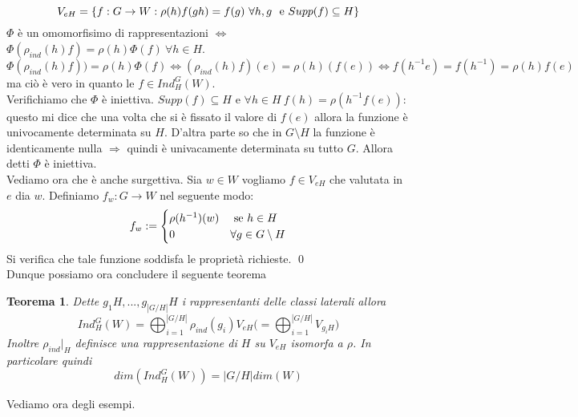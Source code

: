 \documentclass[11pt]{article}
\theoremstyle{plain}
\newtheorem{thm}{Teorema}[section]
\theoremstyle{definition}
\theoremstyle{remark}
\begin{document}
\[V_{eH}=\{f:G\rightarrow W: \rho(h)f(gh)=f(g)\ \forall h,g\ \ \textup{e } Supp(f)\subseteq H\}\]
$\Phi$ è un omomorfisimo di rappresentazioni $\Leftrightarrow$ $\Phi(\rho_{ind}(h)f)=\rho(h)\Phi(f)\ \forall h\in H$.
\[\Phi(\rho_{ind}(h)f))=\rho(h)\Phi(f) \Leftrightarrow (\rho_{ind}(h)f)(e)=\rho(h)(f(e))\Leftrightarrow f(h^{-1}e)=f(h^{-1})=\rho(h)f(e)\]
ma ciò è vero in quanto le $f\in Ind_H^G(W)$. \\
Verifichiamo che $\Phi$ è iniettiva. $Supp(f)\subseteq H$ e $\forall h\in H\ f(h)=\rho(h^{-1}f(e))$: questo mi dice che una volta che si è fissato il valore di $f(e)$ allora la funzione è univocamente determinata su $H$. D'altra parte so che in $G\setminus H$ la funzione è identicamente nulla $\Rightarrow$ quindi è univacamente determinata su tutto $G$. Allora detti $\Phi$ è iniettiva.\\
Vediamo ora che è anche surgettiva. Sia $w\in W$ vogliamo $f\in V_{eH}$ che valutata in $e$ dia $w$. Definiamo $f_w:G\rightarrow W$ nel seguente modo: 
\[f_w:=\begin{cases}
\rho(h^{-1})(w)& \textup{ se } h\in H\\
0& \forall g\in G\setminus H
\end{cases}\]
Si verifica che tale funzione soddisfa le proprietà richieste. \qed \\
Dunque possiamo ora concludere il seguente teorema
\begin{thm} Dette $g_1H,...,g_{|G/H|}H$ i rappresentanti delle classi laterali allora 
\[Ind_H^G(W)=\bigoplus_{i=1}^{|G/H|}\rho_{ind}(g_i)V_{eH}\bigl( =\bigoplus_{i=1}^{|G/H|} V_{g_iH}\bigr) \]
Inoltre $\rho_{ind}|_H$ definisce una rappresentazione di $H$ su $V_{eH}$ isomorfa a $\rho$. In particolare quindi 
\[dim(Ind_H^G(W))=|G/H|dim(W)\] 
\end{thm}
Vediamo ora degli esempi.
\end{document}
